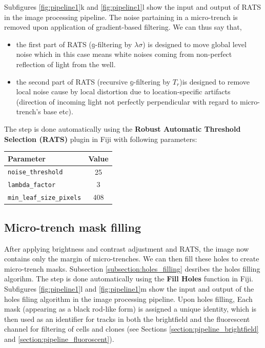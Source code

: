 \documentclass[pdftex,12pt,a4paper]{report}
\begin{document}
Subfigures \ref{fig:pipeline1}k and \ref{fig:pipeline1}l show the input and output of  RATS in the image processing pipeline. The noise partaining in a micro-trench is removed upon application of gradient-based filtering. We can thus say that,

\begin{itemize}
\item the first part of RATS ($\mathbb{g}$-filtering by $\lambda \sigma$) is designed to move global level noise  which in this case means white noises coming from non-perfect reflection of light from the well.
\item the second part of RATS (recursive $\mathbb{g}$-filtering by $T_r$)is designed to remove local noise cause by local distortion due to location-specific artifacts (direction of incoming light not perfectly perpendicular with regard to micro-trench's base etc).
\end{itemize}

The step is done automatically using the \textbf{Robust Automatic Threshold Selection (RATS)} plugin in Fiji with following parameters:

\begin{table}[H]
\centering
\begin{tabular}[t]{ l | c }
Parameter & Value \\
\hline
\texttt{noise\_threshold} & 25 \\
\texttt{lambda\_factor} & 3 \\
\texttt{min\_leaf\_size\_pixels} & 408 \\
\end{tabular}
\end{table}

\subsection{Micro-trench mask filling}

After applying brightness and contrast adjustment and RATS, the image now contains only the margin of micro-trenches. We can then fill these holes to create micro-trench masks. Subsection \ref{subsection:holes_filling} desribes the holes filling algorihm. The step is done automatically using the \textbf{Fill Holes} function in Fiji. Subfigures \ref{fig:pipeline1}l and \ref{fig:pipeline1}m show the input and output of the holes filing algorithm in the image processing pipeline. Upon holes filling, Each mask (appearing as a black rod-like form) is assigned a unique identity, which is then used as an identifier for tracks in both the brightfield and the fluorescent channel for filtering of cells and clones (see Sections \ref{section:pipeline_brightfield} and \ref{section:pipeline_fluoroscent}).
\end{document}
